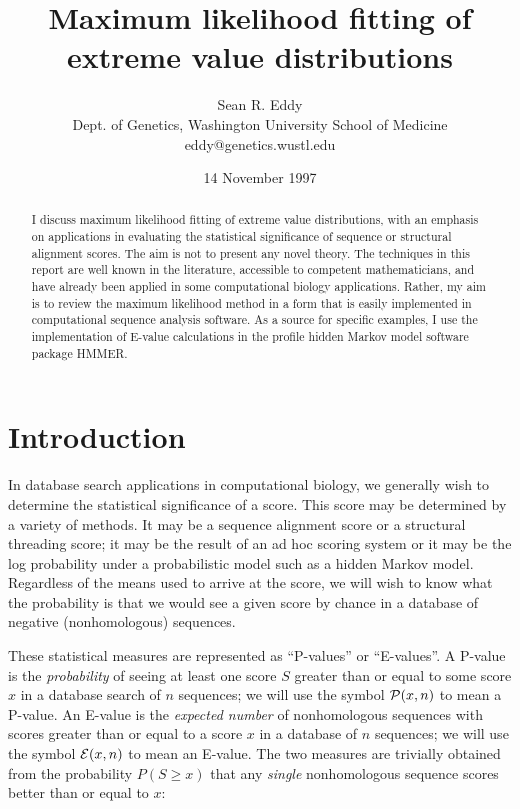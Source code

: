 


\title{Maximum likelihood fitting of extreme value distributions}
\author{Sean R. Eddy\\
Dept. of Genetics, Washington University School of Medicine\\
eddy@genetics.wustl.edu}
\date{14 November 1997}
\maketitle

\begin{abstract}
I discuss maximum likelihood fitting of extreme value distributions,
with an emphasis on applications in evaluating the statistical
significance of sequence or structural alignment scores. The aim is
not to present any novel theory. The techniques in this report are
well known in the literature, accessible to competent mathematicians,
and have already been applied in some computational biology
applications. Rather, my aim is to review the maximum likelihood
method in a form that is easily implemented in computational sequence
analysis software. As a source for specific examples, I use the
implementation of E-value calculations in the profile hidden Markov
model software package HMMER.
\end{abstract}

\section{Introduction}

In database search applications in computational biology, we generally
wish to determine the statistical significance of a score. This score
may be determined by a variety of methods. It may be a sequence
alignment score or a structural threading score; it may be the result
of an ad hoc scoring system or it may be the log probability under a
probabilistic model such as a hidden Markov model. Regardless of the
means used to arrive at the score, we will wish to know what the
probability is that we would see a given score by chance in a database
of negative (nonhomologous) sequences.

These statistical measures are represented as ``P-values'' or
``E-values''. A P-value is the {\em probability} of seeing at least
one score $S$ greater than or equal to some score $x$ in a database
search of $n$ sequences; we will use the symbol ${\cal P}(x,n)$ to
mean a P-value.  An E-value is the {\em expected number} of
nonhomologous sequences with scores greater than or equal to a score
$x$ in a database of $n$ sequences; we will use the symbol ${\cal
E}(x,n)$ to mean an E-value. The two measures are trivially obtained
from the probability $P(S \geq x)$ that any {\em single} nonhomologous
sequence scores better than or equal to $x$:

